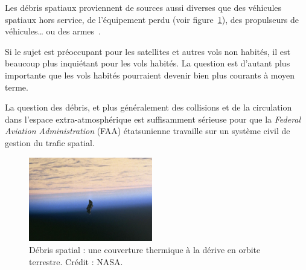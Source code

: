 	Les débris spatiaux proviennent de sources aussi diverses que des véhicules spatiaux hors service, de l'équipement perdu (voir figure~\ref{fig:spaceDeb}), des propulseurs de véhicules\ldots{} ou des armes\footnotemark~\cite{chun1999shooting}.
	
	
	Si le sujet est préoccupant pour les satellites et autres vols non habités, il est beaucoup plus inquiétant pour les vols habités. La question est d'autant plus importante que les vols habités pourraient devenir bien plus courants à moyen terme\footnotemark.
	
	
	La question des débris, et plus généralement des collisions et de la circulation dans l'espace extra-atmosphérique est suffisamment sérieuse pour que la \emph{Federal Aviation Administration} (FAA) étatsunienne travaille sur un système civil de gestion du trafic spatial\footnotemark.
	
	
	\begin{figure} %
		\centering
		\includegraphics[width=0.48\textwidth]{figures/ch1/space_debris_zoom}
		\caption[Débris spatial]{Débris spatial : une couverture thermique à la dérive en orbite terrestre. Crédit : NASA\protect\footnotemark.}
		\label{fig:spaceDeb}
	\end{figure}
	

